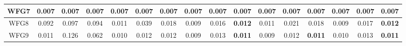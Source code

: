 \begin{table}[H]
{\begin{tabular}{c|c|c|c|c|c|c|c|c|c|c|c|c|c|c|c|}
\multicolumn{1}{|c|}{WFG7} & 0.007 & 0.007 & \textbf{0.007} & 0.007 & 0.007 & \textbf{0.007} & 0.007 & 0.007 & \textbf{0.007} & 0.007 & 0.007 & \textbf{0.007} & 0.007 & 0.007 & \textbf{0.007} \\ \hline
\multicolumn{1}{|c|}{WFG8} & 0.092 & 0.097 & 0.094 & 0.011 & 0.039 & 0.018 & 0.009 & 0.016 & \textbf{0.012} & 0.011 & 0.021 & 0.018 & 0.009 & 0.017 & \textbf{0.012} \\ \hline
\multicolumn{1}{|c|}{WFG9} & 0.011 & 0.126 & 0.062 & 0.010 & 0.012 & 0.012 & 0.009 & 0.013 & \textbf{0.011} & 0.009 & 0.012 & \textbf{0.011} & 0.010 & 0.013 & \textbf{0.011} \\ \hline
\end{tabular}%
}
\end{table}



